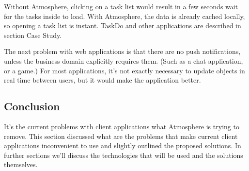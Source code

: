 Without Atmosphere, clicking on a task list would result in a few seconds wait for the tasks inside to load. With Atmosphere, the data is already cached locally, so opening a task list is instant. TaskDo and other applications are described in section Case Study.

The next problem with web applications is that there are no push notifications, unless the business domain explicitly requires them. (Such as a chat application, or a game.) For most applications, it’s not exactly necessary to update objects  in real time between users, but it would make the application better.

\subsection{Conclusion}

It’s the current problems with client applications what Atmosphere is trying to remove. This section discussed what are the problems that make current client applications inconvenient to use and slightly outlined the proposed solutions. In further sections we’ll discuss the technologies that will be used and the solutions themselves.